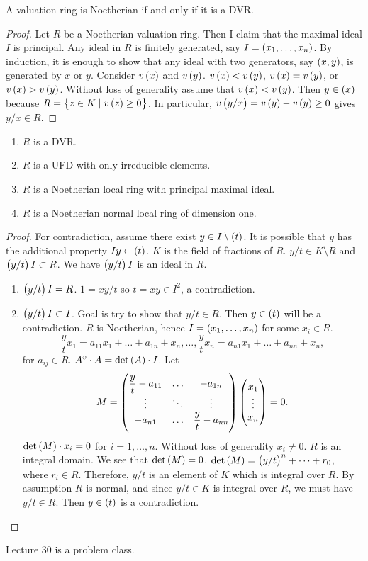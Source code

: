 \begin{theorem}
A valuation ring is Noetherian if and only if it is a DVR.
\end{theorem}

\begin{proof}
Let $ R $ be a Noetherian valuation ring. Then I claim that the maximal ideal $ I $ is principal. Any ideal in $ R $ is finitely generated, say $ I = \br{x_1, \dots, x_n} $. By induction, it is enough to show that any ideal with two generators, say $ \br{x, y} $, is generated by $ x $ or $ y $. Consider $ v\br{x} $ and $ v\br{y} $. $ v\br{x} < v\br{y} $, $ v\br{x} = v\br{y} $, or $ v\br{x} > v\br{y} $. Without loss of generality assume that $ v\br{x} < v\br{y} $. Then $ y \in \br{x} $ because $ R = \cbr{z \in K \mid v\br{z} \ge 0} $. In particular, $ v\br{y / x} = v\br{y} - v\br{y} \ge 0 $ gives $ y / x \in R $.
\end{proof}


\begin{theorem}
\hfill
\begin{enumerate}
\item $ R $ is a DVR.
\item $ R $ is a UFD with only irreducible elements.
\item $ R $ is a Noetherian local ring with principal maximal ideal.
\item $ R $ is a Noetherian normal local ring of dimension one.
\end{enumerate}
\end{theorem}

\begin{proof}
For contradiction, assume there exist $ y \in I \setminus \br{t} $. It is possible that $ y $ has the additional property $ Iy \subset \br{t} $. $ K $ is the field of fractions of $ R $. $ y / t \in K \setminus R $ and $ \br{y / t}I \subset R $. We have $ \br{y / t}I $ is an ideal in $ R $.
\begin{enumerate}
\item $ \br{y / t}I = R $. $ 1 = xy / t $ so $ t = xy \in I^2 $, a contradiction.
\item $ \br{y / t}I \subset I $. Goal is try to show that $ y / t \in R $. Then $ y \in \br{t} $ will be a contradiction. $ R $ is Noetherian, hence $ I = \br{x_1, \dots, x_n} $ for some $ x_i \in R $.
$$ \dfrac{y}{t}x_1 = a_{11}x_1 + \dots + a_{1n} + x_n, \dots, \dfrac{y}{t}x_n = a_{n1}x_1 + \dots + a_{nn} + x_n, $$
for $ a_{ij} \in R $. $ A^v \cdot A = \det\br{A} \cdot I $. Let
$$ M = \threebythree{\dfrac{y}{t} - a_{11}}{\dots}{-a_{1n}}{\vdots}{\ddots}{\vdots}{-a_{n1}}{\dots}{\dfrac{y}{t} - a_{nn}}\threebyone{x_1}{\vdots}{x_n} = 0. $$
$ \det\br{M} \cdot x_i = 0 $ for $ i = 1, \dots, n $. Without loss of generality $ x_i \ne 0 $. $ R $ is an integral domain. We see that $ \det\br{M} = 0 $. $ \det\br{M} = \br{y / t}^n + \dots + r_0 $, where $ r_i \in R $. Therefore, $ y / t $ is an element of $ K $ which is integral over $ R $. By assumption $ R $ is normal, and since $ y / t \in K $ is integral over $ R $, we must have $ y / t \in R $. Then $ y \in \br{t} $ is a contradiction.
\end{enumerate}
\end{proof}


Lecture 30 is a problem class.

